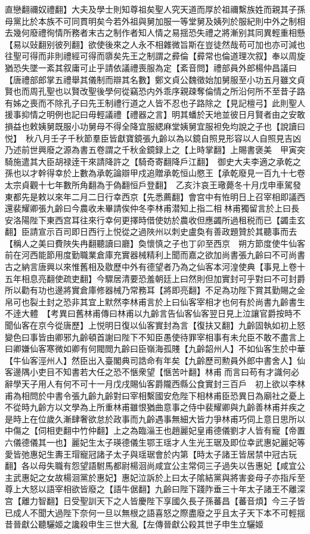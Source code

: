 直戀翻禰奴禮翻】大夫及學士則知尊祖矣聖人究天道而厚於祖禰繫族姓而親其子孫母黨比於本族不可同貫明矣今若外祖與舅加服一等堂舅及姨列於服紀則中外之制相去幾何廢禮徇情所務者末古之制作者知人情之易揺恐失禮之將漸别其同異輕重相懸【易以䜴翻别彼列翻】欲使後來之人永不相雜微旨斯在豈徒然哉苟可加也亦可減也往聖可得而非則禮經可得而隳矣先王之制謂之彛倫【彛常也倫道理次叙】奉以周旋猶恐失墜一紊其叙庸可止乎請依議禮喪服為定【紊音問】禮部員外郎楊仲昌議曰【唐禮部郎掌五禮舉其儀制而辯其名數】鄭文貞公魏徵始加舅服至小功五月雖文貞賢也而周孔聖也以賢改聖後學何從竊恐内外乖序親疎奪倫情之所沿何所不至昔子路有姊之喪而不除孔子曰先王制禮行道之人皆不忍也子路除之【見記檀弓】此則聖人援事抑情之明例也記曰毋輕議禮【禮器之言】明其蟠於天地並彼日月賢者由之安敢損益也敕姨舅既服小功舅母不得全降宜服緦麻堂姨舅宜服袒免均說之子也【說讀曰悦】　秋八月壬子千秋節羣臣皆獻寶鏡張九齡以為以鏡自照見形容以人自照見吉凶乃述前世興廢之源為書五卷謂之千秋金鏡録上之【上時掌翻】上賜書褒美　甲寅突騎施遣其大臣胡禄逹干來請降許之【騎奇寄翻降戶江翻】　御史大夫李適之承乾之孫也以才幹得幸於上數為承乾論辯甲戍追贈承乾恒山愍王【承乾廢見一百九十七卷太宗貞觀十七年數所角翻為于偽翻恒戶登翻】　乙亥汴哀王璥薨冬十月戊申車駕發東都先是敕以來年二月二日行幸西京【先悉薦翻】會宫中有恠明日上召宰相即議西還裴耀卿張九齡曰今農收未畢請俟仲冬李林甫潜知上指二相林甫獨留言於上曰長安洛陽陛下東西宫耳往來行幸何更擇時借使妨於農收但應蠲所過租税而已【蠲圭玄翻】臣請宣示百司即日西行上悦從之過陜州以刺史盧奐有善政題贊於其聽事而去【稱人之美曰費陜失冉翻聽讀曰廳】奐懷慎之子也丁卯至西京　朔方節度使牛仙客前在河西能節用度勤職業倉庫充實器械精利上聞而嘉之欲加尚書張九齡曰不可尚書古之納言唐興以來惟舊相及敭歷中外有德望者乃為之仙客本河湟使典【事見上卷十五年相息亮翻使疏吏翻】今驟居清要恐羞朝廷上曰然則但加實封可乎對曰不可封爵所以勸有功也邊將實倉庫修器械乃常務耳【將即亮翻】不足為功陛下賞其勤賜之金帛可也裂土封之恐非其宜上默然李林甫言於上曰仙客宰相才也何有於尚書九齡書生不逹大體　【考異曰舊林甫傳曰林甫以九齡言告仙客仙客翌日見上泣讓官爵按時不聞仙客在京今從唐歷】上悦明日復以仙客實封為言【復扶又翻】九齡固執如初上怒變色曰事皆由卿邪九齡頓首謝曰陛下不知臣愚使待罪宰相事有未允臣不敢不盡言上曰卿嫌仙客寒微如卿有何閥閲九齡曰臣嶺海孤賤【九齡韶州人】不如仙客生於中華【牛仙客涇州人】然臣出入臺閣典司誥命有年矣【九齡歷司勲員外郎中書舍人】仙客邊隅小吏目不知書若大任之恐不愜衆望【愜苦叶翻】林甫而言曰苟有才識何必辭學天子用人有何不可十一月戊戌賜仙客爵隴西縣公食實封三百戶　初上欲以李林甫為相問於中書令張九齡九齡對曰宰相繫國安危陛下相林甫臣恐異日為廟社之憂上不從時九齡方以文學為上所重林甫雖恨猶曲意事之侍中裴耀卿與九齡善林甫并疾之是時上在位歲久漸肆奢欲怠於政事而九齡遇事無細大皆力爭林甫巧伺上意日思所以中傷之【伺相吏翻中竹仲翻】上之為臨淄王也趙麗妃皇甫德儀劉才人皆有寵【帝置六儀德儀其一也】麗妃生太子瑛德儀生鄂王瑶才人生光王琚及即位幸武惠妃麗妃等愛皆弛惠妃生夀王瑁寵冠諸子太子與瑶琚會於内第【時太子諸王皆居禁中冠古玩翻】各以母失職有怨望語駙馬都尉楊洄尚咸宜公主常伺三子過失以告惠妃【咸宜公主武惠妃之女故楊洄黨於惠妃】惠妃泣訴於上曰太子隂結黨與將害妾母子亦指斥至尊上大怒以語宰相欲皆廢之【語牛倨翻】九齡曰陛下踐阼垂三十年太子諸王不離深宫【離力智翻】日受聖訓天下之人皆慶陛下享國久長子孫蕃昌【蕃音煩】今三子皆已成人不聞大過陛下奈何一旦以無根之語喜怒之際盡廢之乎且太子天下本不可輕揺昔晉獻公聽驪姬之讒殺申生三世大亂【左傳晉獻公殺其世子申生立驪姬